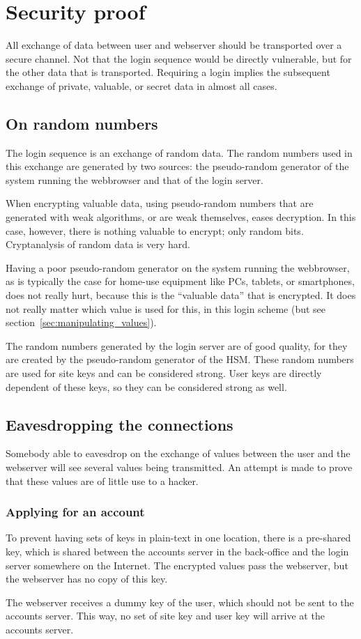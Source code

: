 \section{Security proof}
All exchange of data between user and webserver should be transported over a secure channel.
Not that the login sequence would be directly vulnerable,
but for the other data that is transported.
Requiring a login implies the subsequent exchange of private, valuable, or secret data in almost all cases.
\subsection{On random numbers}
The login sequence is an exchange of random data.
The random numbers used in this exchange are generated by two sources:
the pseudo-random generator of the system running the webbrowser and that of the login server.
\par
When encrypting valuable data,
using pseudo-random numbers that are generated with weak algorithms,
or are weak themselves,
eases decryption.
In this case,
however,
there is nothing valuable to encrypt;
only random bits.
Cryptanalysis of random data is very hard.
\par
Having a poor pseudo-random generator on the system running the webbrowser,
as is typically the case for home-use equipment like PCs,
tablets,
or smartphones,
does not really hurt,
because this is the ``valuable data'' that is encrypted.
It does not really matter which value is used for this,
in this login scheme
(but see section~\ref{sec:manipulating_values}).
\par
The random numbers generated by the login server are of good quality,
for they are created by the pseudo-random generator of the HSM.
These random numbers are used for site keys and can be considered strong.
User keys are directly dependent of these keys,
so they can be considered strong as well.
\subsection{Eavesdropping the connections}
Somebody able to eavesdrop on the exchange of values between the user
and the webserver will see several values being transmitted.
An attempt is made to prove that these values are of little use to a hacker.
\subsubsection{Applying for an account}
To prevent having sets of keys in plain-text in one location,
there is a pre-shared key,
which is shared between the accounts server in the back-office and the login server somewhere on the Internet.
The encrypted values pass the webserver,
but the webserver has no copy of this key.
\par
The webserver receives a dummy key of the user,
which should not be sent to the accounts server.
This way,
no set of site key and user key will arrive at the accounts server.
